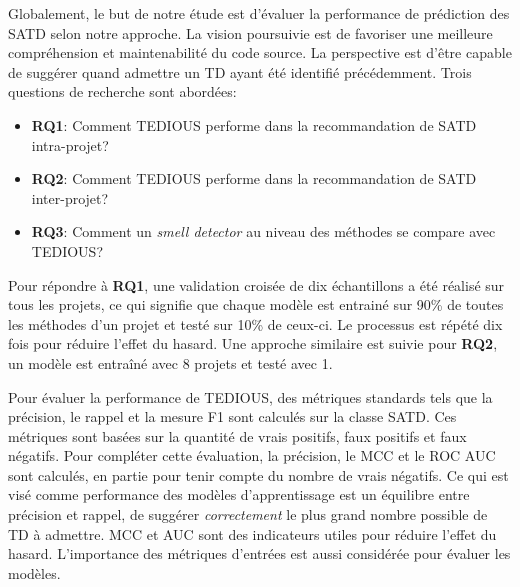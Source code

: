 Globalement, le but de notre \'{e}tude est d'\'{e}valuer la performance de pr\'{e}diction des \ac{SATD} selon notre approche. La vision poursuivie est de favoriser une meilleure compr\'{e}hension et maintenabilit\'{e} du code source. La perspective est d'\^{e}tre capable de sugg\'{e}rer quand admettre un \ac{TD} ayant \'{e}t\'{e} identifi\'{e} pr\'{e}c\'{e}demment. Trois questions de recherche sont abord\'{e}es: \par

\begin{itemize}
	\item \textbf{RQ1}: Comment \ac{TEDIOUS} performe dans la recommandation de \ac{SATD} intra-projet? 
	\item \textbf{RQ2}: Comment \ac{TEDIOUS} performe dans la recommandation de \ac{SATD} inter-projet?
	\item \textbf{RQ3}: Comment un \emph{smell detector} au niveau des m\'{e}thodes se compare avec \ac{TEDIOUS}?
\end{itemize}

Pour r\'{e}pondre \`{a} \textbf{RQ1}, une validation crois\'{e}e de dix \'{e}chantillons a \'{e}t\'{e} r\'{e}alis\'{e} sur tous les projets, ce qui signifie que chaque mod\`{e}le est entrain\'{e} sur 90\% de toutes les m\'{e}thodes d'un projet et test\'{e} sur 10\% de ceux-ci.  Le processus est r\'{e}p\'{e}t\'{e} dix fois pour r\'{e}duire l'effet du hasard. Une approche similaire est suivie pour \textbf{RQ2}, un mod\`{e}le est entra\^{i}n\'{e} avec 8 projets et test\'{e} avec 1. \par

Pour \'{e}valuer la performance de \ac{TEDIOUS}, des m\'{e}triques standards tels que la pr\'{e}cision, le rappel et la mesure F1 sont calcul\'{e}s sur la classe \ac{SATD}. Ces m\'{e}triques sont bas\'{e}es sur la quantit\'{e} de vrais positifs, faux positifs et faux n\'{e}gatifs. Pour compl\'{e}ter cette \'{e}valuation, la pr\'{e}cision, le \ac{MCC} et le \ac{ROC} \ac{AUC} sont calcul\'{e}s, en partie pour tenir compte du nombre de vrais n\'{e}gatifs. Ce qui est vis\'{e} comme performance des mod\`{e}les d'apprentissage est un \'{e}quilibre entre pr\'{e}cision et rappel, de sugg\'{e}rer \emph{correctement} le plus grand nombre possible de \ac{TD} \`{a} admettre. \ac{MCC} et \ac{AUC} sont des indicateurs utiles pour r\'{e}duire l'effet du hasard. L'importance des m\'{e}triques d'entr\'{e}es est aussi consid\'{e}r\'{e}e pour \'{e}valuer les mod\`{e}les. \par

